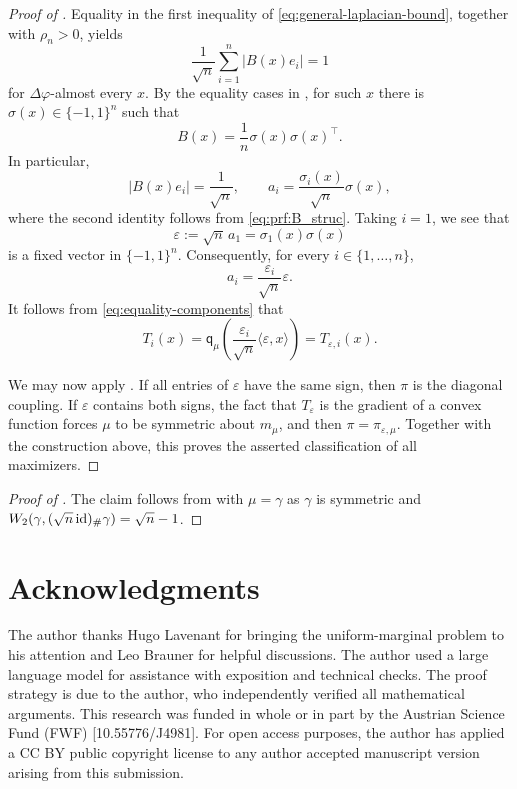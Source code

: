 \documentclass[11pt]{amsart}
\theoremstyle{definition}
\newcommand{\W}{W}
\newcommand{\qmu}{\mathsf q_{\mu}}
\begin{document}
\begin{proof}[Proof of ]
Equality in the first inequality of
\eqref{eq:general-laplacian-bound}, together with $\rho_n>0$, yields
\[
  \frac1{\sqrt n}\sum_{i=1}^n|B(x)e_i|=1
\]
for $\Delta\varphi$-almost every $x$. By the equality cases in
, for such $x$ there is
$\sigma(x)\in\{-1,1\}^n$ such that
\[
  B(x)=\frac1n\sigma(x)\sigma(x)^\top.
\]
In particular,
\[
  |B(x)e_i|=\frac1{\sqrt n},
  \qquad
  a_i=\frac{\sigma_i(x)}{\sqrt n}\sigma(x),
\]
where the second identity follows from \eqref{eq:prf:B_struc}.
Taking $i=1$, we see that
\[
  \varepsilon:=\sqrt n\,a_1=\sigma_1(x)\sigma(x)
\]
is a fixed vector in $\{-1,1\}^n$. Consequently, for every $i\in\{1,\ldots,n\}$, 
\[
  a_i=\frac{\varepsilon_i}{\sqrt n}\varepsilon.
\]
It follows from \eqref{eq:equality-components} that
\[
  T_i(x)
  =
  \qmu\left(
    \frac{\varepsilon_i}{\sqrt n}
    \langle\varepsilon,x\rangle
  \right)
  =
  T_{\varepsilon,i}(x).
\]

We may now apply . If all entries of
$\varepsilon$ have the same sign, then $\pi$ is the diagonal
coupling. If $\varepsilon$ contains both signs, the fact that
$T_\varepsilon$ is the gradient of a convex function forces $\mu$ to
be symmetric about $m_\mu$, and then
$\pi=\pi_{\varepsilon,\mu}$. Together with the construction above,
this proves the asserted classification of all maximizers.
\end{proof}

\begin{proof}[Proof of ]
The claim  follows from  with $\mu=\gamma$ as $\gamma$ is symmetric and  $\W_2(\gamma, (\sqrt{n}\,\textup{id})_\# \gamma) = \sqrt{n}-1$. 
\end{proof}




\section*{Acknowledgments}
The author thanks Hugo Lavenant for bringing the uniform-marginal
problem to his attention and Leo Brauner for helpful discussions. The
author used a large language model for assistance with exposition and
technical checks.
The proof strategy is due to the author, who independently verified all
mathematical arguments. This research was funded in whole or in part by the Austrian Science
Fund (FWF) [10.55776/J4981].
For open access purposes, the author has applied a CC BY public copyright license to any author accepted manuscript version arising from this submission.



\end{document}
